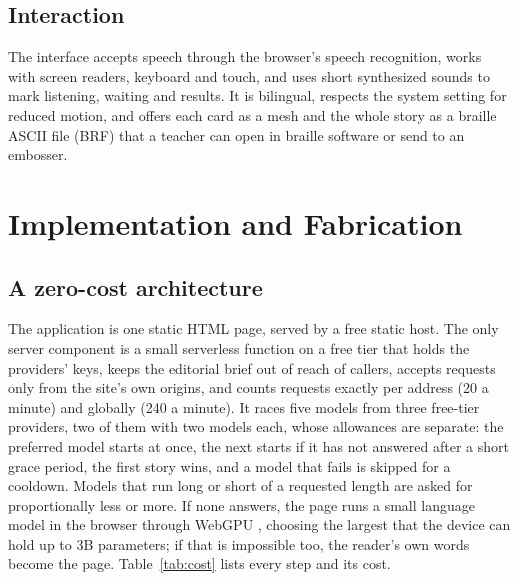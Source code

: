 \documentclass[conference]{IEEEtran}
\begin{document}
\subsection{Interaction}\label{sec:interaction}

The interface accepts speech through the browser's speech recognition, works with screen readers, keyboard and touch, and uses short synthesized sounds to mark listening, waiting and results. It is bilingual, respects the system setting for reduced motion, and offers each card as a mesh and the whole story as a braille ASCII file (BRF) that a teacher can open in braille software or send to an embosser.

\section{Implementation and Fabrication}\label{sec:impl}

\subsection{A zero-cost architecture}

The application is one static HTML page, served by a free static host. The only server component is a small serverless function on a free tier that holds the providers' keys, keeps the editorial brief out of reach of callers, accepts requests only from the site's own origins, and counts requests exactly per address (20 a minute) and globally (240 a minute). It races five models from three free-tier providers, two of them with two models each, whose allowances are separate: the preferred model starts at once, the next starts if it has not answered after a short grace period, the first story wins, and a model that fails is skipped for a cooldown. Models that run long or short of a requested length are asked for proportionally less or more. If none answers, the page runs a small language model in the browser through WebGPU \cite{webllm}, choosing the largest that the device can hold up to 3B parameters; if that is impossible too, the reader's own words become the page. Table~\ref{tab:cost} lists every step and its cost.
\end{document}
